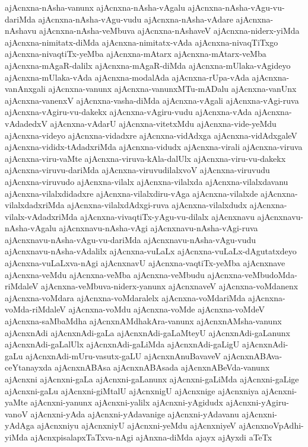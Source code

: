 {ajAcnxna-nAsha-vanunx
ajAcnxna-nAsha-vAgalu
ajAcnxna-nAsha-vAgu-vu-dariMda
ajAcnxna-nAsha-vAgu-vudu
ajAcnxna-nAsha-vAdare
ajAcnxna-nAshavu
ajAcnxna-nAsha-veMbuva
ajAcnxna-nAshaveV
ajAcnxna-niderx-yiMda
ajAcnxna-nimitatx-diMda
ajAcnxna-nimitatx-vAda
ajAcnxna-nivaqTiTxgo
ajAcnxna-nivaqtiTx-yeMba
ajAcnxna-mAtarx
ajAcnxna-mAtarx-veMba
ajAcnxna-mAgaR-dalilx
ajAcnxna-mAgaR-diMda
ajAcnxna-mUlaka-vAgideyo
ajAcnxna-mUlaka-vAda
ajAcnxna-modalAda
ajAcnxna-rUpa-vAda
ajAcnxna-vanAnxgali
ajAcnxna-vanunx
ajAcnxna-vanunxMTu-mADalu
ajAcnxna-vanUnx
ajAcnxna-vanenxV
ajAcnxna-vasha-diMda
ajAcnxna-vAgali
ajAcnxna-vAgi-ruva
ajAcnxna-vAgiru-vu-dakekx
ajAcnxna-vAgiru-vudu
ajAcnxna-vAda
ajAcnxna-vAdadedxV
ajAcnxna-vAdarU
ajAcnxna-vitetxMdu
ajAcnxna-vide-yeMdu
ajAcnxna-videyo
ajAcnxna-vidadxre
ajAcnxna-vidAdxga
ajAcnxna-vidAdxgaleV
ajAcnxna-vididx-tAdadxriMda
ajAcnxna-vidudx
ajAcnxna-virali
ajAcnxna-viruva
ajAcnxna-viru-vaMte
ajAcnxna-viruva-kAla-dalUlx
ajAcnxna-viru-vu-dakekx
ajAcnxna-viruvu-dariMda
ajAcnxna-viruvudilalxvoV
ajAcnxna-viruvudu
ajAcnxna-viruvudo
ajAcnxna-vilalx
ajAcnxna-vilalxda
ajAcnxna-vilalxdavanu
ajAcnxna-vilalxdidadxre
ajAcnxna-vilalxdiru-vAga
ajAcnxna-vilalxde
ajAcnxna-vilalxdadxriMda
ajAcnxna-vilalxdAdxgi-ruva
ajAcnxna-vilalxdudx
ajAcnxna-vilalx-vAdadxriMda
ajAcnxna-vivaqtiTx-yAgu-vu-dilalx
ajAcnxnavu
ajAcnxnavu-nAsha-vAgalu
ajAcnxnavu-nAsha-vAgi
ajAcnxnavu-nAsha-vAgi-ruva
ajAcnxnavu-nAsha-vAgu-vu-dariMda
ajAcnxnavu-nAsha-vAgu-vudu
ajAcnxnavu-nAsha-vAdalilx
ajAcnxna-vuLaLx
ajAcnxna-vuLaLx-dAgutatxdeyo
ajAcnxna-vuLaLxva-nAgi
ajAcnxnavU
ajAcnxna-vaqtiTx-yeMba
ajAcnxnave
ajAcnxna-veMdu
ajAcnxna-veMba
ajAcnxna-veMbudu
ajAcnxna-veMbudoMda-riMdaleV
ajAcnxna-veMbuva-niderx-yanunx
ajAcnxnaveV
ajAcnxna-voMdanenx
ajAcnxna-voMdara
ajAcnxna-voMdaralelx
ajAcnxna-voMdariMda
ajAcnxna-voMda-riMdaleV
ajAcnxna-voMdu
ajAcnxna-voMde
ajAcnxna-voMdeV
ajAcnxna-saMbaMdha
ajAcnxnAMdhakAra-vanunx
ajAcnxnAMsha-vanunx
ajAcnxnAdi
ajAcnxnAdi-gaLa
ajAcnxnAdi-gaLaMteyU
ajAcnxnAdi-gaLanunx
ajAcnxnAdi-gaLalUlx
ajAcnxnAdi-gaLiMda
ajAcnxnAdi-gaLigU
ajAcnxnAdi-gaLu
ajAcnxnAdi-mUru-vasutx-gaLU
ajAcnxnAnuBavaveV
ajAcnxnABAva-ceYtanayxda
ajAcnxnABAsa
ajAcnxnABAsada
ajAcnxnABeVda-vanunx
ajAcnxni
ajAcnxni-gaLa
ajAcnxni-gaLanunx
ajAcnxni-gaLiMda
ajAcnxni-gaLige
ajAcnxni-gaLu
ajAcnxni-giMtalU
ajAcnxnigU
ajAcnxnige
ajAcnxniya
ajAcnxni-yaMte
ajAcnxni-yanunx
ajAcnxni-yalilx
ajAcnxni-yAgidudx
ajAcnxni-yAgiru-vanoV
ajAcnxni-yAda
ajAcnxni-yAdavanige
ajAcnxni-yAdavanu
ajAcnxni-yAdAga
ajAcnxniyu
ajAcnxniyU
ajAcnxni-yeMdu
ajAcnxniyeV
ajAcnxnoVpAdhi-yiMda
ajAcnxpisalapxTaTxva-nAgi
ajAnxna-diMda
ajayx
ajAyxdi
aTeTx
}

